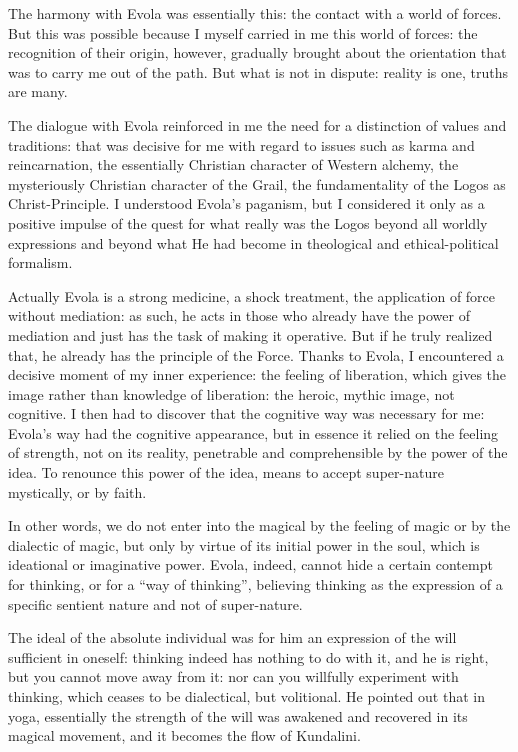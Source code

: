 The harmony with Evola was essentially this: the contact with a world of forces. But this was possible because I myself carried in me this world of forces: the recognition of their origin, however, gradually brought about the orientation that was to carry me out of the path. But what is not in dispute: reality is one, truths are many.

The dialogue with Evola reinforced in me the need for a distinction of values and traditions: that was decisive for me with regard to issues such as karma and reincarnation, the essentially Christian character of Western alchemy, the mysteriously Christian character of the Grail, the fundamentality of the Logos as Christ-Principle. I understood Evola's paganism, but I considered it only as a positive impulse of the quest for what really was the Logos beyond all worldly expressions and beyond what He had become in theological and ethical-political formalism.

Actually Evola is a strong medicine, a shock treatment, the application of force without mediation: as such, he acts in those who already have the power of mediation and just has the task of making it operative. But if he truly realized that, he already has the principle of the Force. Thanks to Evola, I encountered a decisive moment of my inner experience: the feeling of liberation, which gives the image rather than knowledge of liberation: the heroic, mythic image, not cognitive. I then had to discover that the cognitive way was necessary for me: Evola's way had the cognitive appearance, but in essence it relied on the feeling of strength, not on its reality, penetrable and comprehensible by the power of the idea. To renounce this power of the idea, means to accept super-nature mystically, or by faith.

In other words, we do not enter into the magical by the feeling of magic or by the dialectic of magic, but only by virtue of its initial power in the soul, which is ideational or imaginative power. Evola, indeed, cannot hide a certain contempt for thinking, or for a ``way of thinking'', believing thinking as the expression of a specific sentient nature and not of super-nature.

The ideal of the absolute individual was for him an expression of the will sufficient in oneself: thinking indeed has nothing to do with it, and he is right, but you cannot move away from it: nor can you willfully experiment with thinking, which ceases to be dialectical, but volitional. He pointed out that in yoga, essentially the strength of the will was awakened and recovered in its magical movement, and it becomes the flow of Kundalini.

